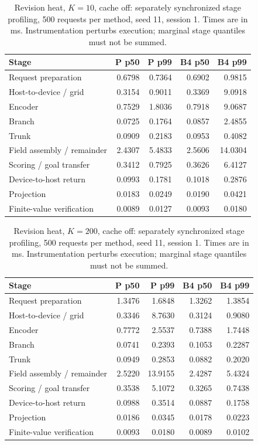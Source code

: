 \begin{table}[ht]
\centering\small
\caption{Revision heat, $K=10$, cache off: separately synchronized stage profiling, 500 requests per method, seed 11, session 1. Times are in ms. Instrumentation perturbs execution; marginal stage quantiles must not be summed.}\label{tab:e2_profile_heat_10_off}
\begin{tabular}{@{}lrrrr@{}}\toprule
Stage & P p50 & P p99 & B4 p50 & B4 p99\\\midrule
Request preparation & 0.6798 & 0.7364 & 0.6902 & 0.9815\\
Host-to-device / grid & 0.3154 & 0.9011 & 0.3369 & 9.0918\\
Encoder & 0.7529 & 1.8036 & 0.7918 & 9.0687\\
Branch & 0.0725 & 0.1764 & 0.0857 & 2.4855\\
Trunk & 0.0909 & 0.2183 & 0.0953 & 0.4082\\
Field assembly / remainder & 2.4307 & 5.4833 & 2.5606 & 14.0304\\
Scoring / goal transfer & 0.3412 & 0.7925 & 0.3626 & 6.4127\\
Device-to-host return & 0.0993 & 0.1781 & 0.1018 & 0.2876\\
Projection & 0.0183 & 0.0249 & 0.0190 & 0.0421\\
Finite-value verification & 0.0089 & 0.0127 & 0.0093 & 0.0180\\
\bottomrule\end{tabular}
\end{table}

\begin{table}[ht]
\centering\small
\caption{Revision heat, $K=200$, cache off: separately synchronized stage profiling, 500 requests per method, seed 11, session 1. Times are in ms. Instrumentation perturbs execution; marginal stage quantiles must not be summed.}\label{tab:e2_profile_heat_200_off}
\begin{tabular}{@{}lrrrr@{}}\toprule
Stage & P p50 & P p99 & B4 p50 & B4 p99\\\midrule
Request preparation & 1.3476 & 1.6848 & 1.3262 & 1.3854\\
Host-to-device / grid & 0.3346 & 8.7630 & 0.3124 & 0.9080\\
Encoder & 0.7772 & 2.5537 & 0.7388 & 1.7448\\
Branch & 0.0741 & 0.2393 & 0.1053 & 0.2287\\
Trunk & 0.0949 & 0.2853 & 0.0882 & 0.2020\\
Field assembly / remainder & 2.5220 & 13.9155 & 2.4287 & 5.4324\\
Scoring / goal transfer & 0.3538 & 5.1072 & 0.3265 & 0.7438\\
Device-to-host return & 0.0988 & 0.3514 & 0.0887 & 0.1758\\
Projection & 0.0186 & 0.0345 & 0.0178 & 0.0223\\
Finite-value verification & 0.0093 & 0.0180 & 0.0089 & 0.0102\\
\bottomrule\end{tabular}
\end{table}

